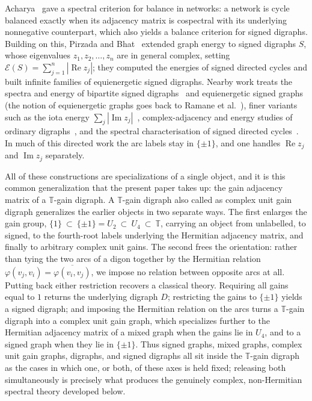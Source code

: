 \documentclass[12pt]{article}
\theoremstyle{definition}
\begin{document}
 Acharya~\cite{Acharya} gave a spectral criterion for balance in networks: a network is cycle balanced exactly when its adjacency matrix is cospectral with its underlying nonnegative counterpart, which also yields a balance criterion for signed digraphs. Building on this, Pirzada and Bhat~\cite{PirzadaBhat} extended graph energy to signed digraphs $S$, whose eigenvalues $z_1,z_2,\dots,z_n$ are in general complex, setting $\mathcal{E}(S) = \sum_{j=1}^n |\operatorname{Re} z_j|$; they computed the energies of signed directed cycles and built infinite families of equienergetic signed digraphs. Nearby work treats the spectra and energy of bipartite signed digraphs~\cite{BhatPirzadaBipartite} and equienergetic signed graphs~\cite{BhatPirzadaEquienergetic} (the notion of equienergetic graphs goes back to Ramane et al.~\cite{Ramane}), finer variants such as the iota energy $\sum_j |\operatorname{Im} z_j|$~\cite{FarooqKhanChand}, complex-adjacency and energy studies of ordinary digraphs~\cite{KhanFarooqRada}, and the spectral characterisation of signed directed cycles~\cite{WissingVanDam}. In much of this directed work the arc labels stay in $\{\pm 1\}$, and one handles $\operatorname{Re} z_j$ and $\operatorname{Im} z_j$ separately.

All of these constructions are specializations of a single object, and it is this common generalization that the present paper takes up: the gain adjacency matrix of a $\mathbb{T}$-gain digraph. A $\mathbb{T}$-gain digraph also called as complex unit gain digraph generalizes the earlier objects in two separate ways. The first enlarges the gain group,
  $\{1\}\ \subset\ \{\pm1\}=U_2\ \subset\ U_4\ \subset\ \mathbb{T}$,
carrying an object from unlabelled, to signed, to the fourth-root labels underlying the Hermitian adjacency matrix, and finally to arbitrary complex unit gains. The second frees the orientation: rather than tying the two arcs of a digon together by the Hermitian relation $\varphi(v_j,v_i)=\overline{\varphi(v_i,v_j)}$, we impose no relation between opposite arcs at all. Putting back either restriction recovers a classical theory. Requiring all gains equal to $1$ returns the underlying digraph $D$; restricting the gains to $\{\pm1\}$ yields a signed digraph; and imposing the
Hermitian relation on the arcs turns a $\mathbb{T}$-gain digraph into a complex unit gain graph, which specializes further to the Hermitian adjacency matrix of a mixed graph when the gains lie in $U_4$, and to a signed graph when they lie in $\{\pm1\}$. Thus signed graphs, mixed graphs, complex unit gain graphs, digraphs, and signed digraphs all sit inside the $\mathbb{T}$-gain digraph as the cases in which one, or both, of these axes is held fixed; releasing both simultaneously is precisely what produces the genuinely complex, non-Hermitian spectral theory developed below.
\end{document}
